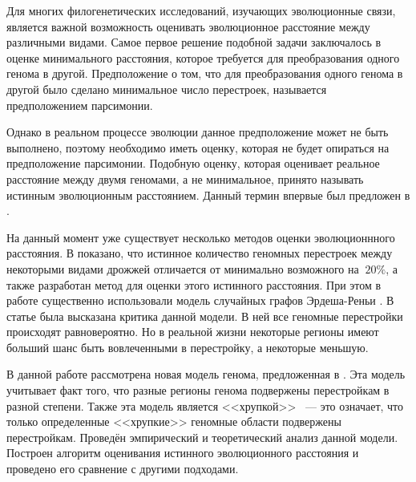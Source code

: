 \startprefacepage

Для многих филогенетических исследований, изучающих эволюционные связи, является важной возможность оценивать эволюционное расстояние между различными видами.
Самое первое решение подобной задачи заключалось в оценке минимального расстояния, которое требуется для преобразования одного генома в другой.
Предположение о том, что для преобразования одного генома в другой было сделано минимальное число перестроек, называется предположением парсимонии.

Однако в реальном процессе эволюции данное предположение может не быть выполнено, поэтому необходимо иметь оценку, которая не будет опираться на предположение парсимонии.
Подобную оценку, которая оценивает реальное расстояние между двумя геномами, а не минимальное, принято называть истинным эволюционным расстоянием.
Данный термин впервые был предложен в \cite{termin}.

На данный момент уже существует несколько методов оценки эволюционнного расстояния.
В \cite{alexeev-1} показано, что истинное количество геномных перестроек между некоторыми видами дрожжей отличается от минимально возможного на $~20\%$, а также разработан метод для оценки этого истинного расстояния.
При этом в работе существенно использовали модель случайных графов Эрдеша-Реньи \cite{erdos}.
В статье \cite{fr-4} была высказана критика данной модели. В ней все геномные перестройки происходят равновероятно.
Но в реальной жизни некоторые регионы имеют больший шанс быть вовлеченными в перестройку, а некоторые меньшую.

В данной работе рассмотрена новая модель генома, предложенная в \cite{fr-4}.
Эта модель учитывает факт того, что разные регионы генома подвержены перестройкам в разной степени.
Также эта модель является <<хрупкой>> ~--- это означает, что только определенные <<хрупкие>> геномные области подвержены перестройкам.
Проведён эмпирический и теоретический анализ данной модели.
Построен алгоритм оценивания истинного эволюционного расстояния и проведено его сравнение с другими подходами.